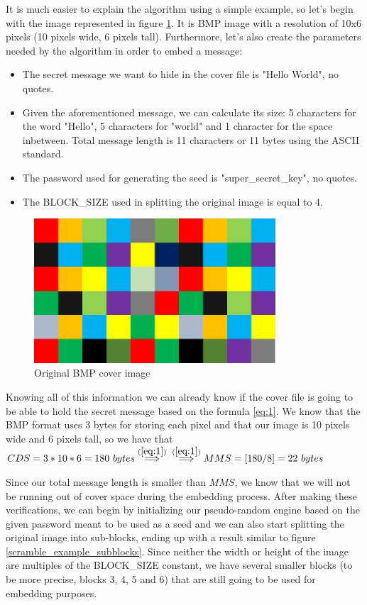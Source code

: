 It is much easier to explain the algorithm using a simple example, so let's begin with the image represented in figure \ref{scramble_example_original_image}. It is BMP image with a resolution of 10x6 pixels (10 pixels wide, 6 pixels tall). Furthermore, let's also create the parameters needed by the algorithm in order to embed a message:
\begin{itemize}
  \item The secret message we want to hide in the cover file is "Hello World", no quotes.
  \item Given the aforementioned message, we can calculate its size: 5 characters for the word "Hello", 5 characters for "world" and 1 character for the space inbetween. Total message length is 11 characters or 11 bytes using the ASCII standard. 
  \item The password used for generating the seed is "super\_secret\_key", no quotes.
  \item The BLOCK\_SIZE used in splitting the original image is equal to 4.
\end{itemize}

\begin{figure}[H]
    \centering
    \includegraphics[width=9cm,keepaspectratio]{pics/bmp_scrambling/original_image}
    \caption{Original BMP cover image}
    \label{scramble_example_original_image}
\end{figure}

Knowing all of this information we can already know if the cover file is going to be able to hold the secret message based on the formula \ref{eq:1}. We know that the BMP format uses 3 bytes for storing each pixel and that our image is 10 pixels wide and 6 pixels tall, so we have that 
\\$CDS=3*10*6=180\ bytes \overset{(\ref{eq:1})}{ \implies }\\ \overset{(\ref{eq:1})}{ \implies } MMS=[180/8]=22\ bytes$

Since our total message length is smaller than $MMS$, we know that we will not be running out of cover space during the embedding process. After making these verifications, we can begin by initializing our pseudo-random engine based on the given password meant to be used as a seed and we can also start splitting the original image into sub-blocks, ending up with a result similar to figure \ref{scramble_example_subblocks}. Since neither the width or height of the image are multiples of the BLOCK\_SIZE constant, we have several smaller blocks (to be more precise, blocks 3, 4, 5 and 6) that are still going to be used for embedding purposes. 

